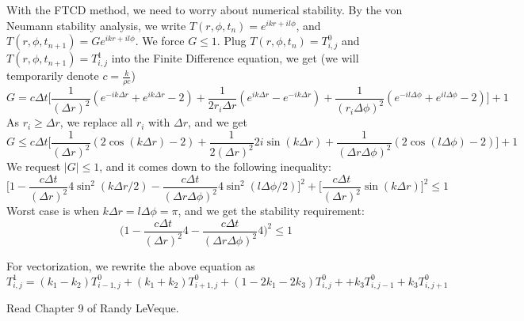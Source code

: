 \documentclass[12pt]{article}
\begin{document}
With the FTCD method, we need to worry about numerical stability. By the von Neumann stability analysis, we write $T(r,\phi, t_n)=e^{ikr+il\phi}$, and $T(r,\phi, t_{n+1})=Ge^{ikr+il\phi}$. We force $G\leq 1$. Plug $T(r,\phi, t_n)=T^0_{i,j}$ and $T(r,\phi, t_{n+1})=T^1_{i,j}$ into the Finite Difference equation, we get (we will temporarily denote $c=\frac{k}{\rho c}$)
\begin{equation}
G = c\Delta t \bigg[\frac{1}{(\Delta r)^2}(e^{-ik\Delta r}+e^{ik\Delta r}-2)+\frac{1}{2r_i\Delta r}(e^{ik\Delta r}-e^{-ik\Delta r})+\frac{1}{(r_i\Delta \phi)^2}(e^{-il\Delta \phi}+e^{il\Delta \phi}-2)\bigg]+1
\end{equation}
As $r_i\geq \Delta r$, we replace all $r_i$ with $\Delta r$, and we get 
\begin{equation}
G\leq c\Delta t \bigg[\frac{1}{(\Delta r)^2}(2\cos(k\Delta r)-2)+\frac{1}{2(\Delta r)^2}2i\sin(k\Delta r)+\frac{1}{(\Delta r\Delta \phi)^2}(2\cos(l\Delta \phi)-2)\bigg]+1
\end{equation}
We request $|G|\leq 1$, and it comes down to the following inequality:
\begin{equation}
\bigg[1-\frac{c\Delta t}{(\Delta r)^2}4\sin^2(k\Delta r/2)-\frac{c\Delta t}{(\Delta r\Delta \phi)^2}4\sin^2(l\Delta \phi/2)\bigg]^2+\bigg[\frac{c\Delta t}{(\Delta r)^2}\sin(k\Delta r)\bigg]^2\leq 1
\end{equation}
Worst case is when $k\Delta r = l\Delta \phi = \pi$, and we get the stability requirement: 
\begin{equation}
\bigg(1-\frac{c\Delta t}{(\Delta r)^2}4-\frac{c\Delta t}{(\Delta r\Delta \phi)^2}4\bigg)^2\leq 1
\end{equation}


For vectorization, we rewrite the above equation as 
\begin{equation}
T^1_{i,j}= (k_1-k_2)T^0_{i-1,j}+(k_1+k_2)T^0_{i+1,j}+(1-2k_1-2k_3)T^0_{i,j}+
+k_3T^0_{i,j-1}+k_3T^0_{i,j+1}
\end{equation}

Read Chapter 9 of Randy LeVeque. 

\end{document}
